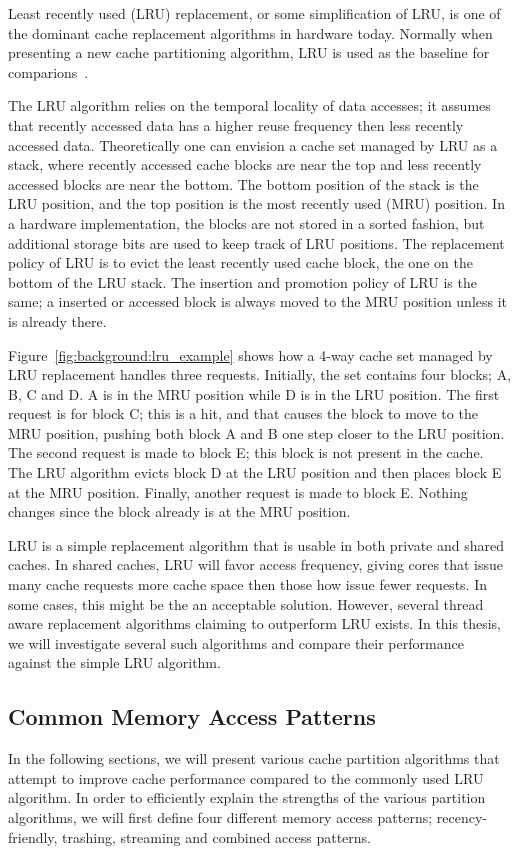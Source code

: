 Least recently used (LRU) replacement, or some simplification of LRU, is one of the dominant cache replacement algorithms in hardware today. 
Normally when presenting a new cache partitioning algorithm, LRU is used as the baseline for comparions~\cite{Jaleel2010,Qureshi2006,Qureshi2007}.

The LRU algorithm relies on the temporal locality of data accesses; it assumes that recently accessed data has a higher reuse frequency then less recently accessed data.
Theoretically one can envision a cache set managed by LRU as a stack, where recently accessed cache blocks are near the top and less recently accessed blocks are near the bottom.
The bottom position of the stack is the LRU position, and the top position is the most recently used (MRU) position.
In a hardware implementation, the blocks are not stored in a sorted fashion, but additional storage bits are used to keep track of LRU positions.
The replacement policy of LRU is to evict the least recently used cache block, the one on the bottom of the LRU stack.
The insertion and promotion policy of LRU is the same; a inserted or accessed block is always moved to the MRU position unless it is already there.

Figure~\ref{fig:background:lru_example} shows how a 4-way cache set managed by LRU replacement handles three requests. 
Initially, the set contains four blocks; A, B, C and D. 
A is in the MRU position while D is in the LRU position.
The first request is for block C; this is a hit, and that causes the block to move to the MRU position, pushing both block A and B one step closer to the LRU position.
The second request is made to block E; this block is not present in the cache.
The LRU algorithm evicts block D at the LRU position and then places block E at the MRU position.
Finally, another request is made to block E. Nothing changes since the block already is at the MRU position.

LRU is a simple replacement algorithm that is usable in both private and shared caches.
In shared caches, LRU will favor access frequency, giving cores that issue many cache requests more cache space then those how issue fewer requests. 
In some cases, this might be the an acceptable solution. 
However, several thread aware replacement algorithms claiming to outperform LRU exists. 
In this thesis, we will investigate several such algorithms and compare their performance against the simple LRU algorithm.



\subsection{Common Memory Access Patterns}
In the following sections, we will present various cache partition algorithms that attempt to improve cache performance compared to the commonly used LRU algorithm.
In order to efficiently explain the strengths of the various partition algorithms, we will first define four different memory access patterns; recency-friendly, trashing, streaming and combined access patterns.


